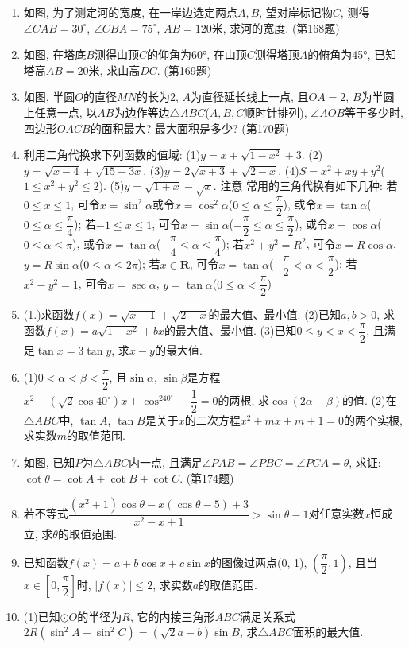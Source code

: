 \documentclass[10pt,a4paper]{article}
\begin{document}
\begin{enumerate}[1.]
\item 如图, 为了测定河的宽度, 在一岸边选定两点$A,B$, 望对岸标记物$C$, 测得$\angle CAB=30^\circ$, $\angle CBA=75^\circ$, $AB=120$米, 求河的宽度.
(第168题)
\item 如图, 在塔底$B$测得山顶$C$的仰角为60°, 在山顶$C$测得塔顶$A$的俯角为45°, 已知塔高$AB=20$米, 求山高$DC$.
(第169题)
\item 如图, 半圆$O$的直径$MN$的长为2, $A$为直径延长线上一点, 且$OA=2$, $B$为半圆上任意一点, 以$AB$为边作等边$\triangle ABC$($A,B,C$顺时针排列), $\angle AOB$等于多少时, 四边形$OACB$的面积最大? 最大面积是多少?
(第170题)
\item 利用二角代换求下列函数的值域:
(1)$y=x+\sqrt {1-x^2}+3$.					(2)$y=\sqrt {x-4}+\sqrt {15-3x}$.
(3)$y=2\sqrt {x+3}+\sqrt {2-x}$.				(4)$S=x^2+xy+y^2$($1\le x^2+y^2\le 2$).
(5)$y=\sqrt {1+x}-\sqrt x$.
注意  常用的三角代换有如下几种:
若$0\le x\le 1$, 可令$x=\sin ^2\alpha$或令$x=\cos ^2\alpha$($0\le \alpha \le \dfrac{\pi }2$), 或令$x=\tan \alpha$($0\le \alpha \le \dfrac{\pi }4$);
若$-1\le x\le 1$, 可令$x=\sin \alpha$($-\dfrac{\pi }2\le \alpha \le \dfrac{\pi }2$), 或令$x=\cos \alpha$($0\le \alpha \le \pi$), 或令$x=\tan \alpha$($-\dfrac{\pi }4\le \alpha \le \dfrac{\pi }4$);
若$x^2+y^2=R^2$, 可令$x=R\cos \alpha$, $y=R\sin \alpha$($0\le \alpha \le 2\pi$);
若$x\in \mathbf{R}$, 可令$x=\tan \alpha$($-\dfrac{\pi }2<\alpha <\dfrac{\pi }2$);
若$x^2-y^2=1$, 可令$x=\sec \alpha$, $y=\tan \alpha$($0\le \alpha <\dfrac{\pi }2$)
\item (1.)求函数$f(x)=\sqrt {x-1}+\sqrt {2-x}$的最大值、最小值.
(2)已知$a,b>0$, 求函数$f(x)=a\sqrt {1-x^2}+bx$的最大值、最小值.
(3)已知$0\le y<x<\dfrac{\pi }2$, 且满足$\tan x=3\tan y$, 求$x-y$的最大值.
\item (1)$0<\alpha <\beta <\dfrac{\pi }2$, 且$\sin \alpha$, $\sin \beta$是方程$x^2-(\sqrt 2\cos 40^\circ)x+\cos ^240^\circ -\dfrac 12=0$的两根, 求$\cos (2\alpha -\beta)$的值.
(2)在$\triangle ABC$中, $\tan A$, $\tan B$是关于$x$的二次方程$x^2+mx+m+1=0$的两个实根, 求实数$m$的取值范围.
\item 如图, 已知$P$为$\triangle ABC$内一点, 且满足$\angle PAB=\angle PBC=\angle PCA=\theta$, 求证: $\cot \theta =\cot A+\cot B+\cot C$.
(第174题)
\item 若不等式$\dfrac{(x^2+1)\cos \theta -x(\cos \theta -5)+3}{x^2-x+1}>\sin \theta -1$对任意实数$x$恒成立, 求$\theta$的取值范围.
\item 已知函数$f(x)=a+b\cos x+c\sin x$的图像过两点(0, 1), $(\dfrac{\pi }2,1)$, 且当$x\in [0,\dfrac{\pi }2]$时, $|f(x)|\le 2$, 求实数$a$的取值范围.
\item (1)已知$\odot O$的半径为$R$, 它的内接三角形$ABC$满足关系式$2R(\sin ^2A-\sin ^2C)=(\sqrt 2a-b)\sin B$, 求$\triangle ABC$面积的最大值.

\end{enumerate}
\end{document}
